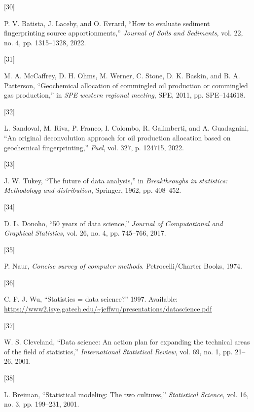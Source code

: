 \documentclass[
  12pt,
  letterpaper,
]{book}
\newlength{\cslhangindent}
\newlength{\csllabelwidth}
\newenvironment{CSLReferences}[2] %
 {\begin{list}{}{%
  \setlength{\itemindent}{0pt}
  \setlength{\leftmargin}{0pt}
  \setlength{\parsep}{0pt}
  \ifodd #1
   \setlength{\leftmargin}{\cslhangindent}
   \setlength{\itemindent}{-1\cslhangindent}
  \fi
  \setlength{\itemsep}{#2\baselineskip}}}
 {\end{list}}
\newcommand{\CSLLeftMargin}[1]{\parbox[t]{\csllabelwidth}{\strut#1\strut}}
\newcommand{\CSLRightInline}[1]{\parbox[t]{\linewidth - \csllabelwidth}{\strut#1\strut}}
\begin{document}
\begin{CSLReferences}{0}{0}
\CSLLeftMargin{{[}30{]} }%
\CSLRightInline{P. V. Batista, J. Laceby, and O. Evrard, {``How to
evaluate sediment fingerprinting source apportionments,''} \emph{Journal
of Soils and Sediments}, vol. 22, no. 4, pp. 1315--1328, 2022.}

\CSLLeftMargin{{[}31{]} }%
\CSLRightInline{M. A. McCaffrey, D. H. Ohms, M. Werner, C. Stone, D. K.
Baskin, and B. A. Patterson, {``Geochemical allocation of commingled oil
production or commingled gas production,''} in \emph{SPE western
regional meeting}, SPE, 2011, pp. SPE--144618.}

\CSLLeftMargin{{[}32{]} }%
\CSLRightInline{L. Sandoval, M. Riva, P. Franco, I. Colombo, R.
Galimberti, and A. Guadagnini, {``An original deconvolution approach for
oil production allocation based on geochemical fingerprinting,''}
\emph{Fuel}, vol. 327, p. 124715, 2022.}

\CSLLeftMargin{{[}33{]} }%
\CSLRightInline{J. W. Tukey, {``The future of data analysis,''} in
\emph{Breakthroughs in statistics: Methodology and distribution},
Springer, 1962, pp. 408--452.}

\CSLLeftMargin{{[}34{]} }%
\CSLRightInline{D. L. Donoho, {``50 years of data science,''}
\emph{Journal of Computational and Graphical Statistics}, vol. 26, no.
4, pp. 745--766, 2017.}

\CSLLeftMargin{{[}35{]} }%
\CSLRightInline{P. Naur, \emph{Concise survey of computer methods}.
Petrocelli/Charter Books, 1974.}

\CSLLeftMargin{{[}36{]} }%
\CSLRightInline{C. F. J. Wu, {``Statistics = data science?''} 1997.
Available:
\url{https://www2.isye.gatech.edu/~jeffwu/presentations/datascience.pdf}}

\CSLLeftMargin{{[}37{]} }%
\CSLRightInline{W. S. Cleveland, {``Data science: An action plan for
expanding the technical areas of the field of statistics,''}
\emph{International Statistical Review}, vol. 69, no. 1, pp. 21--26,
2001.}

\CSLLeftMargin{{[}38{]} }%
\CSLRightInline{L. Breiman, {``Statistical modeling: The two
cultures,''} \emph{Statistical Science}, vol. 16, no. 3, pp. 199--231,
2001.}


\end{CSLReferences}
\end{document}
